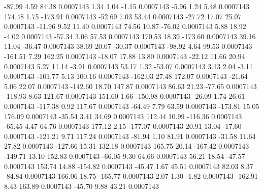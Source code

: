       -87.99        4.59       84.38     0.0007143
        1.34        1.04       -1.15     0.0007143
       -5.96        1.24        5.48     0.0007143
      174.48        1.75     -173.91     0.0007143
      -52.69        7.03       53.44     0.0007143
      -27.72       17.07       25.07     0.0007143
      -11.96        9.52       11.40     0.0007143
       74.56       10.87      -76.02     0.0007143
        5.88       18.92       -4.02     0.0007143
      -57.34        3.06       57.53     0.0007143
      170.53       18.39     -173.60     0.0007143
       39.16       11.04      -36.47     0.0007143
       38.69       20.07      -30.37     0.0007143
      -98.92        4.64       99.53     0.0007143
     -161.51        7.29      162.25     0.0007143
      -18.07       17.88       13.80     0.0007143
      -22.12       11.66       20.94     0.0007143
        5.27       11.14       -3.91     0.0007143
       53.17        1.32      -53.07     0.0007143
        3.13        2.04       -3.11     0.0007143
     -101.77        5.13      100.16     0.0007143
     -162.03       27.48      172.07     0.0007143
      -21.64        5.06       22.07     0.0007143
     -142.60       18.70      147.87     0.0007143
       86.63       21.23      -77.65     0.0007143
     -118.93        8.63      121.67     0.0007143
      151.60        1.66     -150.98     0.0007143
      -26.09        1.74       26.61     0.0007143
     -117.38        0.92      117.67     0.0007143
      -64.49        7.79       63.59     0.0007143
     -173.81       15.05      176.09     0.0007143
      -35.54        3.41       34.69     0.0007143
      112.44       10.99     -116.36     0.0007143
      -65.45        4.47       64.76     0.0007143
      177.12        2.15     -177.07     0.0007143
       20.91       13.04      -17.60     0.0007143
     -121.21        9.71      117.24     0.0007143
      -81.94        1.10       81.91     0.0007143
      -31.58       11.64       27.82     0.0007143
     -127.66       15.31      132.18     0.0007143
      165.75       20.14     -167.42     0.0007143
     -149.71       13.10      152.83     0.0007143
      -66.05        9.30       64.66     0.0007143
       56.21       18.54      -47.57     0.0007143
      153.74       14.88     -154.82     0.0007143
      -45.47        1.67       45.51     0.0007143
       82.03        8.37      -84.84     0.0007143
      166.06       18.75     -165.77     0.0007143
        2.07        1.30       -1.82     0.0007143
     -162.91        8.43      163.89     0.0007143
      -45.70        9.88       43.21     0.0007143
